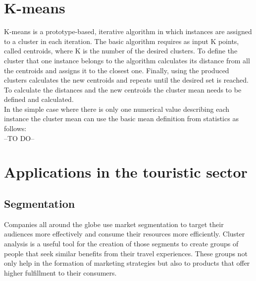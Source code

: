 \section{K-means}
K-means is a prototype-based, iterative algorithm in which instances are assigned to a cluster in each iteration. The basic algorithm requires as input K points, called centroids, where K is the number of the desired clusters. To define the cluster that one instance belongs to the algorithm calculates its distance from all the centroids and assigns it to the closest one. Finally, using the produced clusters calculates the new centroids and repeats until the desired set is reached. To calculate the distances and the new centroids the cluster mean needs to be defined and calculated. \autocite{dunham, tanSteinKum} \\
In the simple case where there is only one numerical value describing each instance the cluster mean can use the basic mean definition from statistics as follows: \\
--TO DO--

\section{Applications in the touristic sector}
\subsection{Segmentation}
Companies all around the globe use market segmentation to target their audiences more effectively and consume their resources more efficiently. Cluster analysis is a useful tool for the creation of those segments to create groups of people that seek similar benefits from their travel experiences.  These groups not only help in the formation of marketing strategies but also to products that offer higher fulfillment to their consumers. \autocite{data-drivenSegmentation} \\